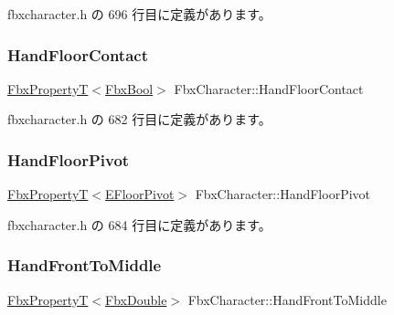  fbxcharacter.\+h の 696 行目に定義があります。

\mbox{\label{class_fbx_character_ac9bb914a52daa67b3dca1ec311b0dc63}} 
\subsubsection{\texorpdfstring{Hand\+Floor\+Contact}{HandFloorContact}}
{\footnotesize\ttfamily \hyperlink{class_fbx_property_t}{Fbx\+PropertyT}$<$\hyperlink{fbxtypes_8h_a92e0562b2fe33e76a242f498b362262e}{Fbx\+Bool}$>$ Fbx\+Character\+::\+Hand\+Floor\+Contact}



 fbxcharacter.\+h の 682 行目に定義があります。

\mbox{\label{class_fbx_character_a3386b370bba6a28b9966ae949e2c3f44}} 
\subsubsection{\texorpdfstring{Hand\+Floor\+Pivot}{HandFloorPivot}}
{\footnotesize\ttfamily \hyperlink{class_fbx_property_t}{Fbx\+PropertyT}$<$\hyperlink{class_fbx_character_a565c1e424493adecfa38e0dcdd17106e}{E\+Floor\+Pivot}$>$ Fbx\+Character\+::\+Hand\+Floor\+Pivot}



 fbxcharacter.\+h の 684 行目に定義があります。

\mbox{\label{class_fbx_character_a8b85a6d7fca56d23eb56d5ad92c63385}} 
\subsubsection{\texorpdfstring{Hand\+Front\+To\+Middle}{HandFrontToMiddle}}
{\footnotesize\ttfamily \hyperlink{class_fbx_property_t}{Fbx\+PropertyT}$<$\hyperlink{fbxtypes_8h_a171e72a1c46fc15c1a6c9c31948c1c5b}{Fbx\+Double}$>$ Fbx\+Character\+::\+Hand\+Front\+To\+Middle}



